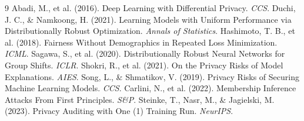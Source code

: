 \documentclass[11pt, a4paper]{article}
\begin{document}

\begin{thebibliography}{9}
 Abadi, M., et al. (2016). Deep Learning with Differential Privacy. \textit{CCS}.
 Duchi, J. C., \& Namkoong, H. (2021). Learning Models with Uniform Performance via Distributionally Robust Optimization. \textit{Annals of Statistics}.
 Hashimoto, T. B., et al. (2018). Fairness Without Demographics in Repeated Loss Minimization. \textit{ICML}.
 Sagawa, S., et al. (2020). Distributionally Robust Neural Networks for Group Shifts. \textit{ICLR}.
 Shokri, R., et al. (2021). On the Privacy Risks of Model Explanations. \textit{AIES}.
 Song, L., \& Shmatikov, V. (2019). Privacy Risks of Securing Machine Learning Models. \textit{CCS}.
 Carlini, N., et al. (2022). Membership Inference Attacks From First Principles. \textit{S\&P}.
 Steinke, T., Nasr, M., \& Jagielski, M. (2023). Privacy Auditing with One (1) Training Run. \textit{NeurIPS}.
\end{thebibliography}
\end{document}
